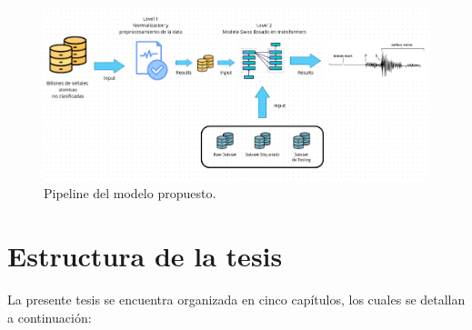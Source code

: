 \begin{figure}[htbp]
\begin{center}
\includegraphics[scale=0.4]{figures/PIPELINE.png}
\caption{Pipeline del modelo propuesto.}
\label{Fig:Pipeline}
\end{center}
\end{figure}

\section{Estructura de la tesis}

La presente tesis se encuentra organizada en cinco capítulos, los cuales se detallan a continuación:

